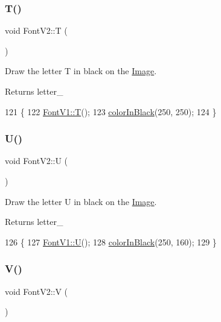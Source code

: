 \subsubsection{\texorpdfstring{T()}{T()}}
{\footnotesize\ttfamily void Font\+V2\+::T (\begin{DoxyParamCaption}{ }\end{DoxyParamCaption})}



Draw the letter T in black on the \mbox{\hyperlink{class_image}{Image}}. 

\begin{DoxyReturn}{Returns}
letter\+\_\+ 
\end{DoxyReturn}

\begin{DoxyCode}
121                \{
122     \mbox{\hyperlink{class_font_v1_ab520e2522e89b6ff20e42621080edd7d}{FontV1::T}}();
123     \mbox{\hyperlink{class_font_v2_a04f2501961bc286ce70fbb6a840b0e8a}{colorInBlack}}(250, 250);
124 \}
\end{DoxyCode}
\mbox{\label{class_font_v2_a893e649c0fccfae9d99322fe5e333369}} 
\subsubsection{\texorpdfstring{U()}{U()}}
{\footnotesize\ttfamily void Font\+V2\+::U (\begin{DoxyParamCaption}{ }\end{DoxyParamCaption})}



Draw the letter U in black on the \mbox{\hyperlink{class_image}{Image}}. 

\begin{DoxyReturn}{Returns}
letter\+\_\+ 
\end{DoxyReturn}

\begin{DoxyCode}
126                \{
127     \mbox{\hyperlink{class_font_v1_a460d625b76b123ba4e67a21091d7dcce}{FontV1::U}}();
128     \mbox{\hyperlink{class_font_v2_a04f2501961bc286ce70fbb6a840b0e8a}{colorInBlack}}(250, 160);
129 \}
\end{DoxyCode}
\mbox{\label{class_font_v2_a58980cf432ef60e1a765b1033da310b4}} 
\subsubsection{\texorpdfstring{V()}{V()}}
{\footnotesize\ttfamily void Font\+V2\+::V (\begin{DoxyParamCaption}{ }\end{DoxyParamCaption})}



